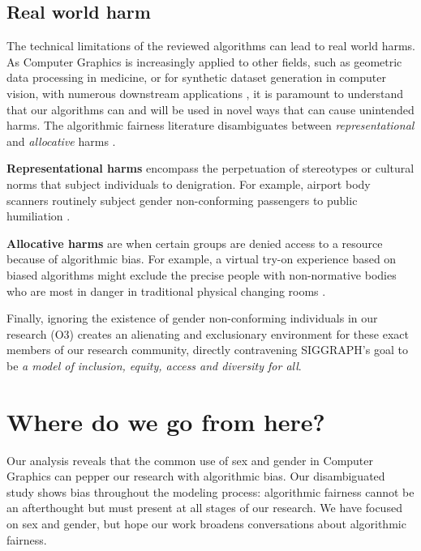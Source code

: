 \documentclass[sigconf,balance=false]{acmart}
\begin{document}
\subsection{Real world harm}

The technical limitations of the reviewed algorithms can lead to real world harms. As Computer Graphics is increasingly applied to other fields, such as geometric data processing in medicine, or for synthetic dataset generation in computer vision, with numerous downstream applications \cite{cars, chen2021synthetic, dhs}, it is paramount to understand that our algorithms can and will be used in novel ways that can cause unintended harms. The algorithmic fairness literature disambiguates between {\em representational} and {\em allocative} harms \cite{barocas-hardt-narayanan}.

{\bf Representational harms} encompass the perpetuation of stereotypes or cultural norms that subject individuals to denigration. For example, airport body scanners routinely subject gender non-conforming passengers to public humiliation \cite{tsa}.

{\bf Allocative harms} are when certain groups are denied access to a resource because of algorithmic bias. For example, a virtual try-on experience based on biased algorithms might exclude the precise people with non-normative bodies who are most in danger in traditional physical changing rooms \cite{changingroom}.

Finally, ignoring the existence of gender non-conforming individuals in our research (O3) creates an alienating and exclusionary environment for these exact members of our research community, directly contravening SIGGRAPH's goal to be \emph{a model of inclusion, equity, access and diversity for all}.

\vspace{-0.1cm}
\section{Where do we go from here?}

Our analysis reveals that the common use of sex and gender in Computer Graphics can pepper our research with algorithmic bias. Our disambiguated study shows bias throughout the modeling process: algorithmic fairness cannot be an afterthought but must present at all stages of our research. We have focused on sex and gender, but hope our work broadens conversations about algorithmic fairness.%
\end{document}

